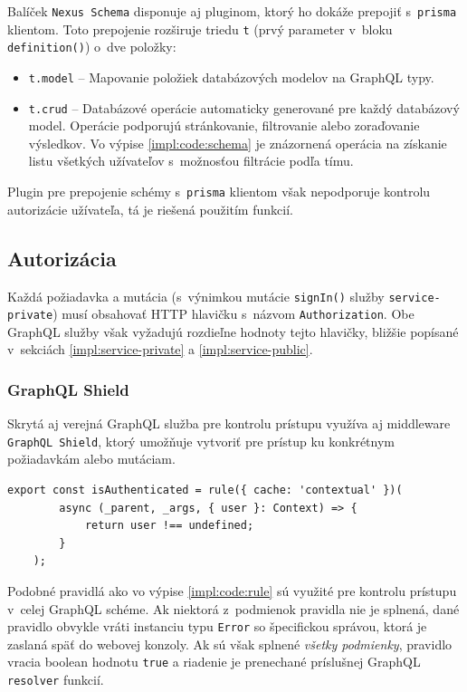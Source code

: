 \noindent Balíček \texttt{Nexus Schema} disponuje aj pluginom, ktorý ho dokáže prepojiť s~\texttt{prisma} klientom. Toto prepojenie rozširuje triedu \texttt{t} (prvý parameter v~bloku \texttt{definition()}) o~dve položky:

\begin{itemize}
	\item \texttt{t.model} -- Mapovanie položiek databázových modelov na GraphQL typy.
	\item \texttt{t.crud} -- Databázové operácie automaticky generované pre každý databázový model. Operácie podporujú stránkovanie, filtrovanie alebo zoraďovanie výsledkov. Vo výpise \ref{impl:code:schema} je znázornená operácia na získanie listu všetkých užívateľov s~možnosťou filtrácie podľa tímu.
\end{itemize}

\noindent Plugin pre prepojenie schémy s~\texttt{prisma} klientom však nepodporuje kontrolu autorizácie užívateľa, tá je riešená použitím  funkcií.

\subsection{Autorizácia}
Každá požiadavka a mutácia (s~výnimkou mutácie \texttt{signIn()} služby \texttt{service-private}) musí obsahovať HTTP hlavičku s~názvom \texttt{Authorization}. Obe GraphQL služby však vyžadujú rozdieľne hodnoty tejto hlavičky, bližšie popísané v~sekciách \ref{impl:service-private} a \ref{impl:service-public}.

\subsubsection{GraphQL Shield}
Skrytá aj verejná GraphQL služba pre kontrolu prístupu využíva aj middleware \texttt{GraphQL Shield}, ktorý umožňuje vytvoriť  pre prístup ku konkrétnym požiadavkám alebo mutáciam. \\

\begin{lstlisting}[caption={Pravidlo \texttt{GraphQL Shield} kontrolujúce či je užívateľ autentifikovaný.}, label={impl:code:rule}]
	export const isAuthenticated = rule({ cache: 'contextual' })(
		async (_parent, _args, { user }: Context) => {
			return user !== undefined;
		}
	);
\end{lstlisting}

\medskip

\noindent Podobné pravidlá ako vo výpise \ref{impl:code:rule} sú využité pre kontrolu prístupu v~celej GraphQL schéme. Ak niektorá z~podmienok pravidla nie je splnená, dané pravidlo obvykle vráti instanciu typu \texttt{Error} so špecifickou správou, ktorá je zaslaná späť do webovej konzoly. Ak sú však splnené \emph{všetky podmienky}, pravidlo vracia boolean hodnotu \texttt{true} a riadenie je prenechané príslušnej GraphQL \texttt{resolver} funkcií.

